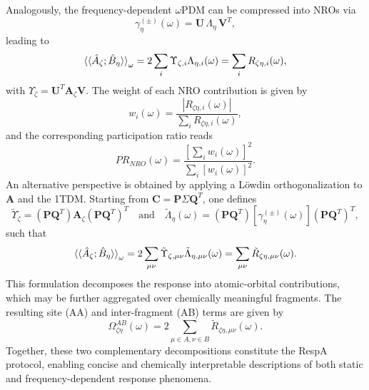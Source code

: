 \documentclass[%
 aip,
 amsmath,amssymb,
preprint,%
]{revtex4-2}
\begin{document}
Analogously, the frequency-dependent $\omega$PDM can be compressed into NROs\cite{dewergifosseUnifiedStrategyChemically2020} via
\begin{equation}
	\gamma^{(\pm)}_{\eta}(\omega) = \mathbf U\,\Lambda_\eta\,\mathbf V^T,\label{eq:nros}
\end{equation}
leading to
\begin{equation*}
	\braket{\braket{\hat A_\zeta; \hat B_\eta}}_{\omega} = 2 \sum_i \Upsilon_{\zeta,i}\Lambda_{ \eta,i}(\omega) = \sum_i R_{\zeta\eta, i}(\omega),
\end{equation*}
with $\Upsilon_\zeta = \mathbf U^T \mathbf A_\zeta \mathbf V$.  
The weight of each NRO contribution is given by
\begin{equation*}
	w_i(\omega) = \frac{|R_{\zeta\eta,i}(\omega)|}{\sum_i R_{\zeta\eta, i}(\omega)},
\end{equation*}
and the corresponding participation ratio reads
\begin{equation*}
	PR_{NRO}(\omega)  = \frac{[\sum_i w_i(\omega)]^2}{\sum_i [w_i(\omega)]^2}.
\end{equation*}
An alternative perspective is obtained by applying a Löwdin orthogonalization to $\mathbf A$ and the 1TDM.  
Starting from $\mathbf C = \mathbf P \Sigma \mathbf Q^T$, one defines
\begin{equation*}
	\tilde{\Upsilon}_{\zeta} = (\mathbf P\mathbf Q^T) \mathbf A_\zeta(\mathbf P\mathbf Q^T)^T
	\quad\text{and}\quad
	\tilde{\Lambda}_{\eta}(\omega) = (\mathbf P\mathbf Q^T)[\gamma^{(\pm)}_{\eta}(\omega)](\mathbf P\mathbf Q^T)^T,
\end{equation*}
such that
\begin{equation*}
	\braket{\braket{\hat A_\zeta; \hat B_\eta}}_{\omega} = 2 \sum_{\mu\nu} \tilde\Upsilon_{\zeta,\mu\nu}\tilde\Lambda_{ \eta,\mu\nu}(\omega) = \sum_{\mu\nu} \tilde R_{\zeta\eta, \mu\nu}(\omega).
\end{equation*}
This formulation decomposes the response into atomic-orbital contributions, which may be further aggregated over chemically meaningful fragments.  
The resulting site (AA) and inter-fragment (AB) terms are given by
\begin{equation*}
	\Omega_{\zeta\eta}^{AB}(\omega) = 2\sum_{\mu\in A,\nu\in B} \tilde R_{\zeta\eta, \mu\nu}(\omega).
\end{equation*}
Together, these two complementary decompositions constitute the RespA protocol,\cite{dewergifosseUnifiedStrategyChemically2020} enabling concise and chemically interpretable descriptions of both static and frequency-dependent response phenomena.
\end{document}
